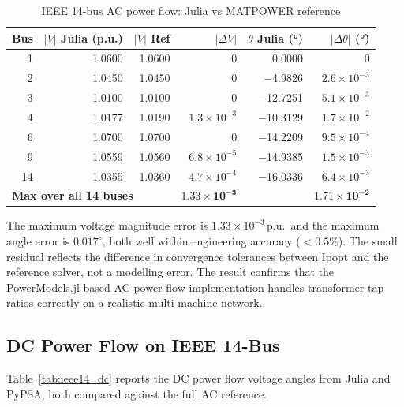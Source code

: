 \begin{table}[H]
\centering
\caption{IEEE 14-bus AC power flow: Julia vs MATPOWER reference}
\label{tab:ieee14_ac}
\begin{tabular}{rrrrrr}
\toprule
\textbf{Bus} & \textbf{$|V|$ Julia (p.u.)} & \textbf{$|V|$ Ref} & \textbf{$|\Delta V|$} & \textbf{$\theta$ Julia (°)} & \textbf{$|\Delta\theta|$ (°)} \\
\midrule
 1 & 1.0600 & 1.0600 & $0$          &   0.0000 & $0$        \\
 2 & 1.0450 & 1.0450 & $0$          &  $-$4.9826 & $2.6\times10^{-3}$ \\
 3 & 1.0100 & 1.0100 & $0$          & $-$12.7251 & $5.1\times10^{-3}$ \\
 4 & 1.0177 & 1.0190 & $1.3\times10^{-3}$ & $-$10.3129 & $1.7\times10^{-2}$ \\
 6 & 1.0700 & 1.0700 & $0$          & $-$14.2209 & $9.5\times10^{-4}$ \\
 9 & 1.0559 & 1.0560 & $6.8\times10^{-5}$ & $-$14.9385 & $1.5\times10^{-3}$ \\
14 & 1.0355 & 1.0360 & $4.7\times10^{-4}$ & $-$16.0336 & $6.4\times10^{-3}$ \\
\midrule
\multicolumn{3}{l}{\textbf{Max over all 14 buses}} & $\mathbf{1.33\times10^{-3}}$ & & $\mathbf{1.71\times10^{-2}}$ \\
\bottomrule
\end{tabular}
\end{table}

The maximum voltage magnitude error is $1.33\times10^{-3}$\,p.u.\ and the maximum angle error is $0.017^{\circ}$, both well within engineering accuracy ($<0.5\%$). The small residual reflects the difference in convergence tolerances between Ipopt and the reference solver, not a modelling error. The result confirms that the PowerModels.jl-based AC power flow implementation handles transformer tap ratios correctly on a realistic multi-machine network.

\subsection{DC Power Flow on IEEE 14-Bus}

Table~\ref{tab:ieee14_dc} reports the DC power flow voltage angles from Julia and PyPSA, both compared against the full AC reference.


